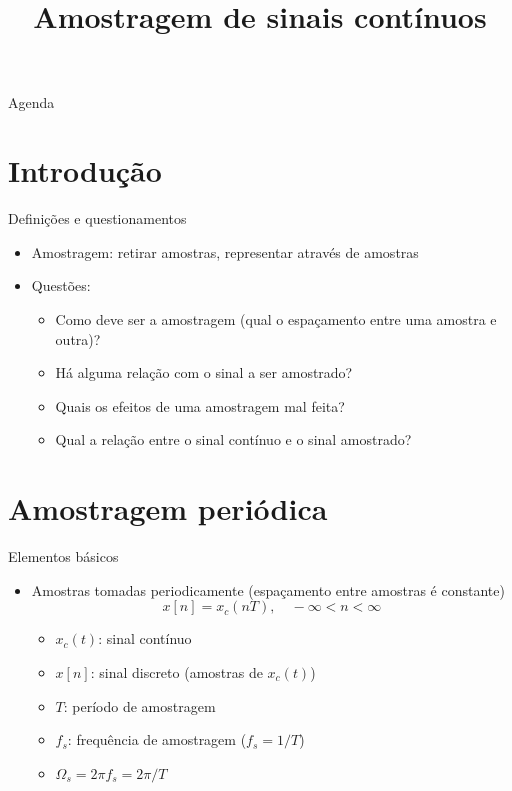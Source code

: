 


\title{\cursogrande\\ \vspace{1cm}Amostragem de sinais contínuos}



\maketitle[randomdots={false}]
   \begin{slide}{Agenda}
      \tableofcontents[content=sections]
   \end{slide}

\section{Introdução}
\begin{slide}{Definições e questionamentos}
\begin{itemize}
   \item Amostragem: retirar amostras, representar atrav\'es de amostras
   \item Quest\~oes:
   \begin{itemize}
      \item Como deve ser a amostragem (qual o espa\c camento entre uma amostra e outra)?
      \item H\'a alguma rela\c c\~ao com o sinal a ser amostrado?
      \item Quais os efeitos de uma amostragem mal feita?
      \item Qual a rela\c c\~ao entre o sinal cont\'inuo e o sinal amostrado?
   \end{itemize}
\end{itemize}
\end{slide}

\section{Amostragem periódica}
\begin{slide}{Elementos básicos}
\begin{itemize}
   \item Amostras tomadas periodicamente (espa\c camento entre amostras \'e constante)
   \begin{equation}
      x[n] = x_c(nT), \quad -\infty<n<\infty
   \end{equation}
   \begin{itemize}
      \item $x_c(t)$: sinal cont\'inuo
      \item $x[n]$: sinal discreto (amostras de $x_c(t)$)
      \item $T$: per\'iodo de amostragem
      \item $f_s$: frequ\^encia de amostragem ($f_s=1/T$)
      \item $\Omega_s=2\pi f_s=2\pi/T$
   \end{itemize}
\end{itemize}
\end{slide}

